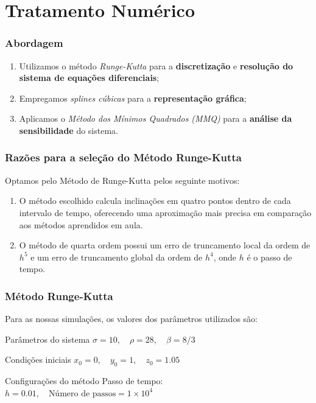 \section{Tratamento Numérico}

\begin{frame}
    \frametitle{Abordagem}
    \begin{enumerate}
        \item Utilizamos o método \textit{Runge-Kutta} para a \textbf{discretização} e \textbf{resolução do sistema de equações diferenciais};
        \item Empregamos \textit{splines cúbicas} para a \textbf{representação gráfica};
        \item Aplicamos o \textit{Método dos Mínimos Quadrados (MMQ)} para a \textbf{análise da sensibilidade} do sistema.
    \end{enumerate}
        
        

\end{frame}


\begin{frame}
    \frametitle{Razões para a seleção do Método Runge-Kutta}
    Optamos pelo Método de Runge-Kutta pelos seguinte motivos:
    \begin{enumerate}
        \item O método escolhido calcula inclinações em quatro pontos dentro de cada intervalo de tempo, oferecendo uma aproximação mais precisa em comparação aos métodos aprendidos em aula.

        \item O método de quarta ordem possui um erro de truncamento local da ordem de $h^5$ e um erro de truncamento global da ordem de $h^4$, onde $h$ é o passo de tempo.
    \end{enumerate}
\end{frame}

\begin{frame}
    \frametitle{Método Runge-Kutta}

    Para as nossas simulações, os valores dos parâmetros utilizados são:

    \begin{block}{Parâmetros do sistema}
        \centering
        $\sigma = 10, \quad \rho = 28, \quad \beta = 8/3$
    \end{block}

    \begin{block}{Condições iniciais}
        \centering
        $x_0 = 0, \quad y_0 = 1, \quad z_0 = 1.05$
    \end{block}

    \begin{block}{Configurações do método}
        \centering
        Passo de tempo: $h = 0.01, \quad \text{Número de passos} = 1 \times 10^4$
    \end{block}

\end{frame}



